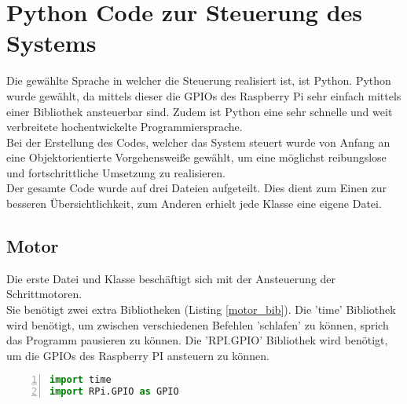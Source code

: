 
\chapter{Python Code zur Steuerung des Systems}\label{chap:code}
Die gewählte Sprache in welcher die Steuerung realisiert ist, ist Python. Python wurde gewählt, da mittels dieser die \acp{GPIO} des Raspberry Pi sehr einfach mittels einer Bibliothek ansteuerbar sind. Zudem ist Python eine sehr schnelle und weit verbreitete hochentwickelte Programmiersprache.\\
Bei der Erstellung des Codes, welcher das System steuert wurde von Anfang an eine Objektorientierte Vorgehensweiße gewählt, um eine möglichst reibungslose und fortschrittliche Umsetzung zu realisieren.\\
Der gesamte Code wurde auf drei Dateien aufgeteilt. Dies dient zum Einen zur besseren Übersichtlichkeit, zum Anderen erhielt jede Klasse eine eigene Datei.
\section{Motor}
Die erste Datei und Klasse beschäftigt sich mit der Ansteuerung der Schrittmotoren.\\
Sie benötigt zwei extra Bibliotheken (Listing \ref{motor_bib}). Die 'time' Bibliothek wird benötigt, um zwischen verschiedenen Befehlen 'schlafen' zu können, sprich das Programm pausieren zu können. Die 'RPI.GPIO' Bibliothek wird benötigt, um die \acp{GPIO} des Raspberry PI ansteuern zu können. 
\begin{lstlisting}[caption={Bibliotheken der Motor Klasse}, language={Python}, label={motor_bib}, numbers=left]
import time
import RPi.GPIO as GPIO	
\end{lstlisting}

